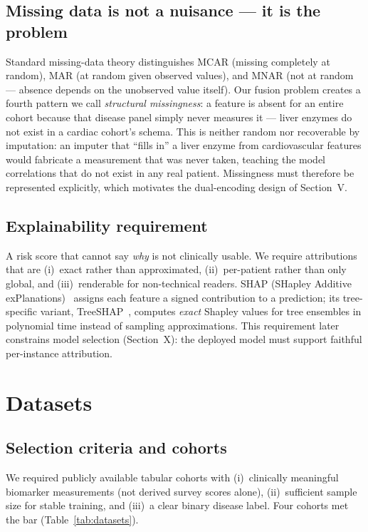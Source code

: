 \documentclass[journal]{IEEEtran}
\begin{document}
\subsection{Missing data is not a nuisance --- it is the problem}
Standard missing-data theory distinguishes MCAR (missing completely at random), MAR (at random given observed values), and MNAR (not at random --- absence depends on the unobserved value itself). Our fusion problem creates a fourth pattern we call \emph{structural missingness}: a feature is absent for an entire cohort because that disease panel simply never measures it --- liver enzymes do not exist in a cardiac cohort's schema. This is neither random nor recoverable by imputation: an imputer that ``fills in'' a liver enzyme from cardiovascular features would fabricate a measurement that was never taken, teaching the model correlations that do not exist in any real patient. Missingness must therefore be represented explicitly, which motivates the dual-encoding design of Section~V.

\subsection{Explainability requirement}
A risk score that cannot say \emph{why} is not clinically usable. We require attributions that are (i)~exact rather than approximated, (ii)~per-patient rather than only global, and (iii)~renderable for non-technical readers. SHAP (SHapley Additive exPlanations)~\cite{lundberg2017shap} assigns each feature a signed contribution to a prediction; its tree-specific variant, TreeSHAP~\cite{lundberg2020treeshap}, computes \emph{exact} Shapley values for tree ensembles in polynomial time instead of sampling approximations. This requirement later constrains model selection (Section~X): the deployed model must support faithful per-instance attribution.

\section{Datasets}
\subsection{Selection criteria and cohorts}
We required publicly available tabular cohorts with (i)~clinically meaningful biomarker measurements (not derived survey scores alone), (ii)~sufficient sample size for stable training, and (iii)~a clear binary disease label. Four cohorts met the bar (Table~\ref{tab:datasets}).
\end{document}
